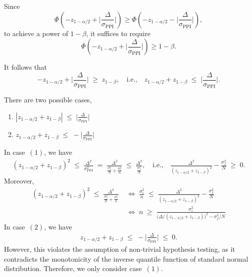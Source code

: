 \noindent Since
\[
\Phi\!\left(-z_{1-\alpha/2}
  + \Bigg|\frac{\Delta}{\sigma_{\mathrm{PPI}}}\Bigg|\right)
\ge
\Phi\!\left(-z_{1-\alpha/2}
  - \Bigg|\frac{\Delta}{\sigma_{\mathrm{PPI}}}\Bigg|\right),
\]
to achieve a power of $1 - \beta$, it suffices to require
\[
\Phi\!\left(-z_{1-\alpha/2}
  + \Bigg|\frac{\Delta}{\sigma_{\mathrm{PPI}}}\Bigg|\right)
\ge 1 - \beta.
\]

\noindent It follows that \[-z_{1-\alpha/2}+\Bigg|\frac{\Delta}{\sigma_{\mathrm{PPI}}}\Bigg|\;\ge\; z_{1-\beta},\quad\text{i.e.,}\quad z_{1-\alpha/2}+z_{1-\beta}\;\le\; \Bigg|\frac{\Delta}{\sigma_{\mathrm{PPI}}}\Bigg|.\]


\noindent There are two possible cases, 
\begin{enumerate}
  \item[(1)] $|z_{1-\alpha/2} + z_{1-\beta}|\;\le\; \Big|\frac{\Delta}{\sigma_{\mathrm{PPI}}}\Big|$
  \item[(2)] $z_{1-\alpha/2} + z_{1-\beta}\;\le\; -\Big|\frac{\Delta}{\sigma_{\mathrm{PPI}}}\Big|$
\end{enumerate}

\noindent
In case~$(1)$, we have 
\begin{align*}
    \left(z_{1-\alpha/2} + z_{1-\beta}\right)^2 \;\le\; \frac{\Delta^2}{\sigma_{\mathrm{PPI}}^2}\;=\;
    \frac{\Delta^2}{\frac{\sigma_f^2}{N} + \frac{\sigma_\varepsilon^2}{n}}\;\le\;
    \frac{\Delta^2}{\frac{\sigma_f^2}{N}},
    \quad\text{i.e.,}\quad \frac{\Delta^2}{\left(z_{1-\alpha/2} + z_{1-\beta}\right)^2}-\frac{\sigma_f^2}{N}\;\ge\;0.
\end{align*}Moreover,
\begin{align*}
     \left(z_{1-\alpha/2} + z_{1-\beta}\right)^2 \;\le\; 
    \frac{\Delta^2}{\frac{\sigma_f^2}{N}
    + \frac{\sigma_\varepsilon^2}{n}}\;&\iff\;
    \frac{\sigma_\varepsilon^2}{n}\;\le\;\frac{\Delta^2}{\left(z_{1-\alpha/2} + z_{1-\beta}\right)^2}-\frac{\sigma_f^2}{N}\\
    &\iff\; n \;\ge\; \frac{\sigma_\varepsilon^2}{\Bigg(\Delta/(z_{1-\alpha/2}+z_{1-\beta})\Bigg)^2 - \sigma_f^2/N}
\end{align*}
In case~$(2)$, we have 
\begin{align*}
    z_{1-\alpha/2} + z_{1-\beta}
    \;\le\;
    -\Bigg|\frac{\Delta}{\sigma_{\mathrm{PPI}}}\Bigg|
    \;\le\; 0.
\end{align*}However, this violates the assumption of non-trivial hypothesis testing, as it contradicts the monotonicity of the inverse quantile function of standard normal distribution. Therefore, we only consider case~$(1)$.

